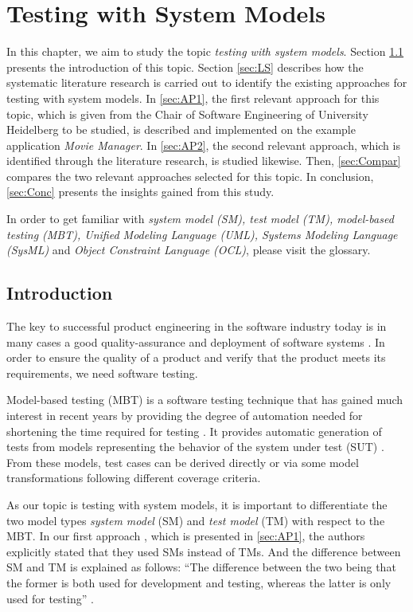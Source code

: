 \chapter{Testing with System Models}
\label{sec:topic_7}

In this chapter, we aim to study the topic \textit{testing with  system models}. Section \ref{sec:Intro7} presents the introduction of this topic. Section \ref{sec:LS} describes how the systematic literature research is carried out to identify the existing approaches for testing with system models. In \autoref{sec:AP1}, the first relevant approach for this topic, which is given from the Chair of Software Engineering of University Heidelberg to be studied, is described and implemented on the example application \textit{Movie Manager}. In \autoref{sec:AP2}, the second relevant approach, which is identified through the literature research, is studied likewise. Then, \autoref{sec:Compar} compares the two relevant approaches selected for this topic. In conclusion, \autoref{sec:Conc} presents the insights gained from this study.

In order to get familiar with \textit{system model (SM), test model (TM), model-based testing (MBT), Unified Modeling Language (UML), Systems Modeling Language (SysML)} and \textit{Object Constraint Language (OCL)}, please visit the glossary.


\section{Introduction}
\label{sec:Intro7}

The key to successful product engineering in the software industry today is in many cases a good quality-assurance and deployment of software systems \cite{Paper1}. In order to ensure the quality of a product and verify that the product meets its requirements, we need software testing. 

Model-based testing (MBT) is a software testing technique that has gained much interest in recent years by providing the degree of automation needed for shortening the time required for testing \cite{Paper1}. It provides automatic generation of tests from models representing the behavior of the system under test (SUT) \cite{matera}. From these models, test cases can be derived directly or via some model transformations following different coverage criteria. 

As our topic is testing with system models, it is important to differentiate the two model types \textit{system model} (SM) and \textit{test model} (TM) with respect to the MBT. In our first approach \cite{Paper1}, which is presented in \autoref{sec:AP1}, the authors explicitly stated that they used SMs instead of TMs. And the difference between SM and TM is explained as follows: \enquote{The difference between the two being that the former is both used for development and testing, whereas the latter is only used for testing} \cite{Paper1}. 

